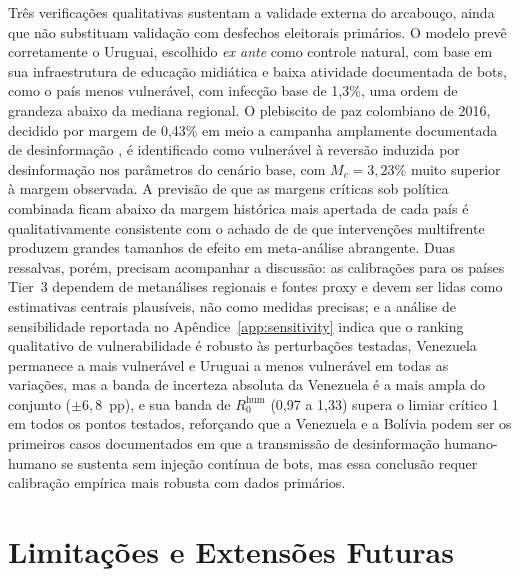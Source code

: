 \documentclass[12pt,a4paper]{article}
\theoremstyle{definition}
\theoremstyle{plain}
\begin{document}
Três verificações qualitativas sustentam a validade externa do arcabouço, ainda que não substituam validação com desfechos eleitorais primários. O modelo prevê corretamente o Uruguai, escolhido \emph{ex ante} como controle natural, com base em sua infraestrutura de educação midiática e baixa atividade documentada de bots, como o país menos vulnerável, com infecção base de 1,3\%, uma ordem de grandeza abaixo da mediana regional. O plebiscito de paz colombiano de 2016, decidido por margem de 0,43\% em meio a campanha amplamente documentada de desinformação \citep{garcia2017peace, colombiacheck2016}, é identificado como vulnerável à reversão induzida por desinformação nos parâmetros do cenário base, com $M_c = 3{,}23\%$ muito superior à margem observada. A previsão de que as margens críticas sob política combinada ficam abaixo da margem histórica mais apertada de cada país é qualitativamente consistente com o achado de \citet{huang2024media} de que intervenções multifrente produzem grandes tamanhos de efeito em meta-análise abrangente. Duas ressalvas, porém, precisam acompanhar a discussão: as calibrações para os países Tier~3 dependem de metanálises regionais e fontes proxy e devem ser lidas como estimativas centrais plausíveis, não como medidas precisas; e a análise de sensibilidade reportada no Apêndice~\ref{app:sensitivity} indica que o ranking qualitativo de vulnerabilidade é robusto às perturbações testadas, Venezuela permanece a mais vulnerável e Uruguai a menos vulnerável em todas as variações, mas a banda de incerteza absoluta da Venezuela é a mais ampla do conjunto ($\pm 6{,}8$~pp), e sua banda de $R_0^{\text{hum}}$ (0,97 a 1,33) supera o limiar crítico 1 em todos os pontos testados, reforçando que a Venezuela e a Bolívia podem ser os primeiros casos documentados em que a transmissão de desinformação humano-humano se sustenta sem injeção contínua de bots, mas essa conclusão requer calibração empírica mais robusta com dados primários.

\section{Limitações e Extensões Futuras}
\label{sec:limitations}
\end{document}

